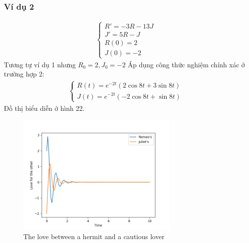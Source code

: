 \subsubsection{Ví dụ 2}
\begin{align*}
    \begin{cases}
        R'=-3R-13J\\
        J'=5R-J\\
        R(0)=2\\
        J(0)=-2
    \end{cases}
\end{align*}
Tương tự ví dụ 1 nhưng $R_0 = 2, J_0 = -2$ Áp dụng công thức nghiệm chính xác ở trường hợp 2:
\begin{align*}
    \begin{cases}
        R(t)=e^{-2t}(2\cos{8t}+3\sin{8t})\\
        J(t)=e^{-2t}(-2\cos{8t}+\sin{8t})
    \end{cases}
\end{align*}
Đồ thị biểu diễn ở hình 22.
\begin{figure}[h!]
    \begin{center}
    \includegraphics[width=8cm]{images/hermit_2.png}
    \end{center}
    \caption{The love between a hermit and a cautious lover}
\end{figure}
